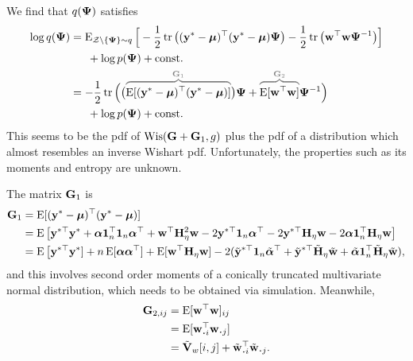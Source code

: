 We find that $q({\bm\Psi})$ satisfies
\begin{align*}
  \log q(\bPsi)
  &= \E_{\cZ\backslash\{\bPsi\}\sim q} \Big[ 
  - \half\tr \big((\by^* - \bmu)^\top (\by^* - \bmu)\bPsi  \big)
  - \half\tr \big( \bw^\top\bw\bPsi^{-1} \big)
  \Big] \\
  &\phantom{==} 
  + \log p(\bPsi)
  + \const \\
  &= -\half \tr \Big(
  \big( %
  \greyoverbrace{\E[(\by^* - \bmu)^\top (\by^* - \bmu)]}{\bG_1}
  \big)\bPsi +
  \greyoverbrace{\E[\bw^\top\bw]}{\bG_2} \bPsi^{-1}
  \Big) \\
  &\phantom{==} 
  + \log p(\bPsi)
  + \const 
\end{align*}
This seems to be the pdf of $\operatorname{Wis}({\mathbf G}+{\mathbf G}_1,g)$ plus the pdf of a distribution which almost resembles an inverse Wishart pdf.
Unfortunately, the properties such as its moments and entropy are unknown.

The matrix ${\mathbf G}_1$ is 
\begin{align*}
  {\mathbf G}_1 
  &= \operatorname{E}[({\mathbf y}^* - {\bm\mu})^\top ({\mathbf y}^* - {\bm\mu})] \\
  &= \operatorname{E} \big[{\mathbf y}^{*\top}{\mathbf y}^* + {\bm\alpha}{\mathbf 1}_n^\top {\mathbf 1}_n{\bm\alpha}^\top + {\mathbf w}^\top{\mathbf H}_\eta^2{\mathbf w} -2{\mathbf y}^{*\top}{\mathbf 1}_n{\bm\alpha}^\top -2{\mathbf y}^{*\top}{\mathbf H}_\eta{\mathbf w} -2 {\bm\alpha}{\mathbf 1}_n^\top{\mathbf H}_\eta{\mathbf w} \big] \\
  &= \operatorname{E} \big[{\mathbf y}^{*\top}{\mathbf y}^*] + n\operatorname{E}[{\bm\alpha}{\bm\alpha}^\top] + \operatorname{E}[{\mathbf w}^\top{\mathbf H}_\eta{\mathbf w}] -2(\tilde{{\mathbf y}}^{*\top}{\mathbf 1}_n\tilde{{\bm\alpha}}^\top + \tilde{{\mathbf y}}^{*\top}\tilde{{\mathbf H}}_\eta\tilde{{\mathbf w}} + \tilde{{\bm\alpha}}{\mathbf 1}_n^\top\tilde{{\mathbf H}}_\eta\tilde{{\mathbf w}}),
\end{align*}
and this involves second order moments of a conically truncated multivariate normal distribution, which needs to be obtained via simulation.
Meanwhile,
\begin{align*}
  \bG_{2,ij}
  &= \E[\bw^\top\bw]_{ij} \\
  &= \E[\bw_{\bigcdot i}^\top \bw_{\bigcdot j}] \\
  &= \tilde\bV_w[i,j] + \tilde\bw_{\bigcdot i}^\top  \tilde\bw_{\bigcdot j}.
\end{align*}

